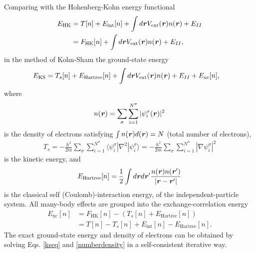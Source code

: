 Comparing with the Hohenberg-Kohn energy functional 
\begin{equation}\label{hkeq}
\begin{aligned}
E_\text{HK}
&=T[n]+E_\text{int}[n]+\int{d\textbf{\textit r}}V_\text{ext}(\textbf{\textit r})n(\textbf{\textit r})+E_{II} \\
&=F_\text{HK}[n]+\int{d\textbf{\textit r}}V_\text{ext}(\textbf{\textit r})n(\textbf{\textit r})+E_{II},
\end{aligned}
\end{equation}
in the method of Kohn-Sham the ground-state energy
\begin{equation}\label{kse}
\begin{aligned}
E_\text{KS}&=T_s[n]+E_\text{Hartree}[n]+\int d\textbf{\textit r}V_\text{ext}(\textbf{\textit r})n(\textbf{\textit r})+E_{II}+E_\text{xc}[n],
\end{aligned}
\end{equation}
where 
\begin{equation}\label{numberdensity}
\begin{aligned}
n(\textbf{\textit r})=\sum_\sigma\sum_{i=1}^{N^\sigma}|\psi_i^\sigma(\textbf{\textit r})|^2
\end{aligned}
\end{equation}
is the density of electrons satisfying $\int n(\textbf{\textit r})d(\textbf{\textit r})=N$ (total number of electrons),
\begin{equation}\label{spTs}
\begin{aligned}
T_s=-\frac{\hbar^2}{2m}\sum_\sigma\sum_{i=1}^{N^\sigma}\langle\psi_i^\sigma|\nabla^2|\psi_i^\sigma\rangle=-\frac{\hbar^2}{2m}\sum_\sigma\sum_{i=1}^{N^\sigma}|\nabla\psi_i^\sigma|^2
\end{aligned}
\end{equation}
is the kinetic energy, and 
\begin{equation}\label{spEhatr}
\begin{aligned}
E_\text{Hartree}[n]=\frac{1}{2}\int{d\textbf{\textit r}d\textbf{\textit r}'}\frac{n(\textbf{\textit r})n(\textbf{\textit r}')}{|\textbf{\textit r}-\textbf{\textit r}'|}
\end{aligned}
\end{equation}
is the classical self (Coulomb)-interaction energy, of the independent-particle system. All many-body effects are grouped into the exchange-correlation energy 
\begin{equation}\label{spExc}
\begin{aligned}
E_\text{xc}[n]&=F_\text{HK}[n]-(T_s[n]+E_\text{Hartree}[n]) \\
&=T[n]-T_s[n]+E_\text{int}[n]-E_\text{Hartree}[n].
\end{aligned}
\end{equation}
%
The exact ground-state energy and density of electrons
can be obtained by solving Eqs. \ref{kseq} and \ref{numberdensity} in a
self-consistent iterative way.

